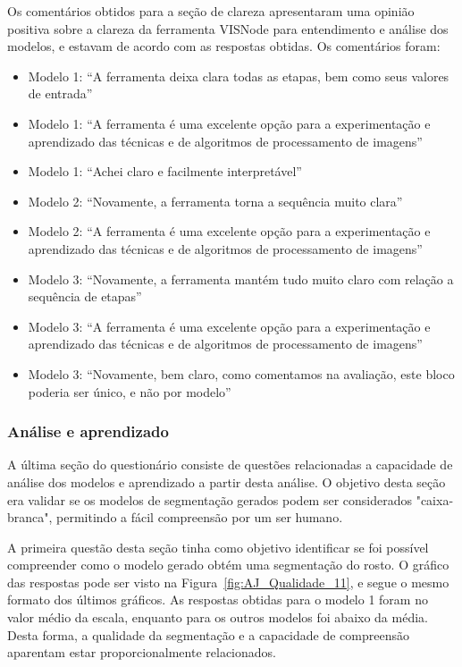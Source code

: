 \documentclass[12pt,oneside,a4paper,english,french,spanish,brazil,]{abntex2}
\begin{document}
Os comentários obtidos para a seção de clareza apresentaram uma opinião positiva sobre a clareza da ferramenta VISNode para entendimento e análise dos modelos, e estavam de acordo com as respostas obtidas. Os comentários foram:
\begin{itemize}
    \item Modelo 1: ``A ferramenta deixa clara todas as etapas, bem como seus valores de entrada''
    \item Modelo 1: ``A ferramenta é uma excelente opção para a experimentação e aprendizado das técnicas e de algoritmos de processamento de imagens''
    \item Modelo 1: ``Achei claro e facilmente interpretável''
    \item Modelo 2: ``Novamente, a ferramenta torna a sequência muito clara''
    \item Modelo 2: ``A ferramenta é uma excelente opção para a experimentação e aprendizado das técnicas e de algoritmos de processamento de imagens''
    \item Modelo 3: ``Novamente, a ferramenta mantém tudo muito claro com relação a sequência de etapas''
    \item Modelo 3: ``A ferramenta é uma excelente opção para a experimentação e aprendizado das técnicas e de algoritmos de processamento de imagens''
    \item Modelo 3: ``Novamente, bem claro, como comentamos na avaliação, este bloco poderia ser único, e não por modelo''
\end{itemize}

\subsubsection{Análise e aprendizado}

A última seção do questionário consiste de questões relacionadas a capacidade de análise dos modelos e aprendizado a partir desta análise. O objetivo desta seção era validar se os modelos de segmentação gerados podem ser considerados "caixa-branca", permitindo a fácil compreensão por um ser humano.

A primeira questão desta seção tinha como objetivo identificar se foi possível compreender como o modelo gerado obtém uma segmentação do rosto. O gráfico das respostas pode ser visto na Figura~\ref{fig:AJ_Qualidade_11}, e segue o mesmo formato dos últimos gráficos. As respostas obtidas para o modelo 1 foram no valor médio da escala, enquanto para os outros modelos foi abaixo da média. Desta forma, a qualidade da segmentação e a capacidade de compreensão aparentam estar proporcionalmente relacionados.
\end{document}
